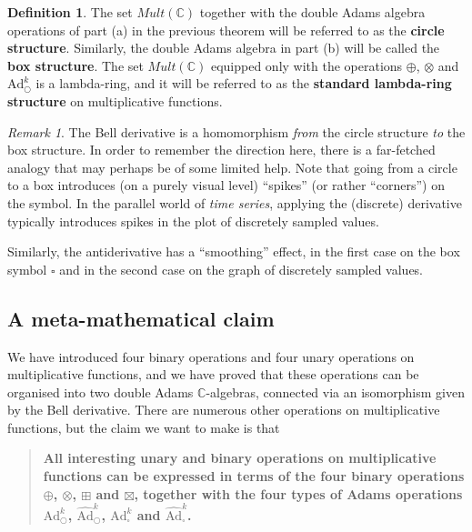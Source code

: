 \documentclass[a4paper]{article}
\theoremstyle{definition}
\newtheorem{definition}{Definition}[section]
\theoremstyle{remark}
\newtheorem*{remark}{Remark}
\newcommand{\adam}[1]{\text{Ad}^{#1}_{\bigcirc}}
\newcommand{\hatadam}[1]{\widehat{\text{Ad}}^{#1}_{\bigcirc}}
\newcommand{\boxadam}[1]{\text{Ad}^{#1}_{\square}}
\newcommand{\hatboxadam}[1]{\widehat{\text{Ad}}^{#1}_{\square}}
\newcommand{\C}{\mathbb{C}}
\newcommand{\defhl}[1]{\textbf{#1}}
\begin{document}
\begin{definition}
The set $Mult(\C)$ together with the double Adams algebra operations of part (a) in the previous theorem will be referred to as the \defhl{circle structure}. Similarly, the double Adams algebra in part (b) will be called the \defhl{box structure}. The set $Mult(\C)$ equipped only with the operations $\oplus$, $\otimes$ and $\adam{k}$ is a lambda-ring, and it will be referred to as the \defhl{standard lambda-ring structure} on multiplicative functions.
 \end{definition}


\begin{remark}
The Bell derivative is a homomorphism \emph{from} the circle structure \emph{to} the box structure. In order to remember the direction here, there is a far-fetched analogy that may perhaps be of some limited help. Note that going from a circle to a box introduces (on a purely visual level) ``spikes'' (or rather ``corners'') on the symbol. In the parallel world of \emph{time series}, applying the (discrete) derivative typically introduces spikes in the plot of discretely sampled values. 

Similarly, the antiderivative has a ``smoothing'' effect, in the first case on the box symbol $\square$ and in the second case on the graph of discretely sampled values. 


\end{remark}



\subsection{A meta-mathematical claim}

We have introduced four binary operations and four unary operations on multiplicative functions, and we have proved that these operations can be organised into two double Adams $\C$-algebras, connected via an isomorphism given by the Bell derivative. There are numerous other operations on multiplicative functions, but the claim we want to make is that
\begin{quote}
\textbf{All interesting unary and binary operations on multiplicative functions can be expressed in terms of the four binary operations $\oplus$, $\otimes$, $\boxplus$ and $\boxtimes$, together with the four types of Adams operations $\adam{k}$, $\hatadam{k}$, $\boxadam{k}$ and $\hatboxadam{k}$.}
\end{quote}
\end{document}
